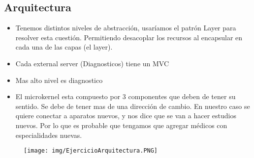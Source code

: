\subsection*{Arquitectura}


\begin{itemize}
\item Tenemos distintos niveles de abstracción, usaríamos el patrón Layer para resolver esta cuestión. Permitiendo desacoplar los recursos al encapsular en cada una de las capas (el layer).
\item Cada external server (Diagnosticos) tiene un MVC
\item Mas alto nivel es diagnostico
\item El microkernel esta compuesto por 3 componentes que deben de tener su sentido. Se debe de tener mas de una dirección de cambio. En nuestro caso se quiere conectar a aparatos nuevos, y nos dice que se van a hacer estudios nuevos. Por lo que es probable que tengamos que agregar médicos con especialidades nuevas.
\end{itemize}

\begin{figure}[!htb]
    \centering
    \texttt{[image: img/EjercicioArquitectura.PNG]}
\end{figure}


